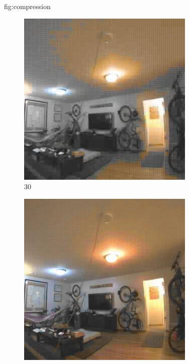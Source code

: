 \begin{definefigure}{fig:compression}
\captionsetup[subfigure]{labelformat=empty}
\centering
\begin{subfigure}{0.4\columnwidth}
\includegraphics[width=\linewidth]{figs/permacam/30.jpeg}
\vspace{-1.5\baselineskip}
\caption{30}
\label{fig:30}
\end{subfigure}
%
\begin{subfigure}{0.4\columnwidth}
\includegraphics[width=\linewidth]{figs/permacam/70.jpeg}

\end{subfigure}
\end{definefigure}
